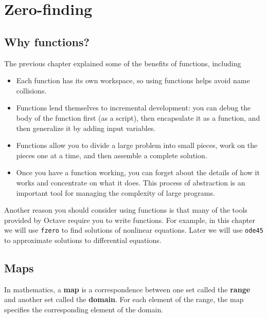 
\chapter{Zero-finding}


\section{Why functions?}

The previous chapter explained some of the benefits of functions,
including

\begin{itemize}

\item Each function has its own workspace, so using functions helps
avoid name collisions.

\item Functions lend themselves to incremental development: you can
debug the body of the function first (as a script), then encapsulate
it as a function, and then generalize it by adding input variables.

\item Functions allow you to divide a large problem into small
pieces, work on the pieces one at a time, and then assemble a
complete solution.

\item Once you have a function working, you can forget about the
details of how it works and concentrate on what it does. This
process of abstraction is an important tool for managing the
complexity of large programs.

\end{itemize}

Another reason you should consider using functions is that many of the
tools provided by Octave require you to write functions. For example,
in this chapter we will use {\tt fzero} to find solutions of nonlinear
equations. Later we will use {\tt ode45} to approximate solutions to
differential equations.


\section{Maps}
\label{map}

In mathematics, a {\bf map} is a correspondence between one
set called the {\bf range} and another set called the
{\bf domain}. For each element of the range, the map specifies
the corresponding element of the domain.

